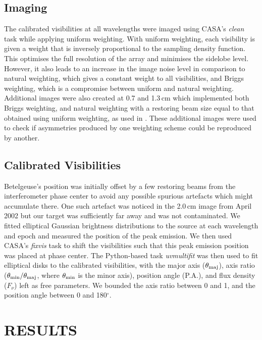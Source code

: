 \documentclass[iop]{emulateapj}
\begin{document}
\subsection{Imaging}\label{obs2.1}
The calibrated visibilities at all wavelengths were imaged using CASA's \textit{clean} task while applying uniform weighting. With uniform weighting, each visibility is given a weight that is inversely proportional to the sampling density function. This optimises the full resolution of the array and minimises the sidelobe level. However, it also leads to an increase in the image noise level in comparison to natural weighting, which gives a constant weight to all visibilities, and Briggs weighting, which is a compromise between uniform and natural weighting. Additional images were also created at 0.7 and 1.3\,cm which implemented both Briggs weighting, and natural weighting with a restoring beam size equal to that obtained using uniform weighting, as used in \cite{lim_1998}. These additional images were used to check if asymmetries produced by one weighting scheme could be reproduced by another.

\subsection{Calibrated Visibilities}\label{obs2.2}
Betelgeuse's position was initially offset by a few restoring beams from the interferometer phase center to avoid any possible spurious artefacts which might accumulate there. One such artefact was noticed in the 2.0\,cm image from April 2002 but our target was sufficiently far away and was not contaminated. We fitted elliptical Gaussian brightness distributions to the source at each wavelength and epoch and measured the position of the peak emission. We then used CASA's \textit{fixvis} task to shift the visibilities such that this peak emission position was placed at phase center. The Python-based task \textit{uvmultifit} \citep{marti_vidal_2014} was then used to fit elliptical disks to the calibrated visibilities, with the major axis ($\theta _{\rm{maj}}$), axis ratio ($\theta _{\rm{min}}/\theta _{\rm{maj}}$, where $\theta _{\rm{min}}$ is the minor axis), position angle (P.A.), and flux density ($F_{\nu}$) left as free parameters. We bounded the axis ratio between 0 and 1, and the position angle between 0 and 180$^{\circ}$.

\section{RESULTS} 
\end{document}
